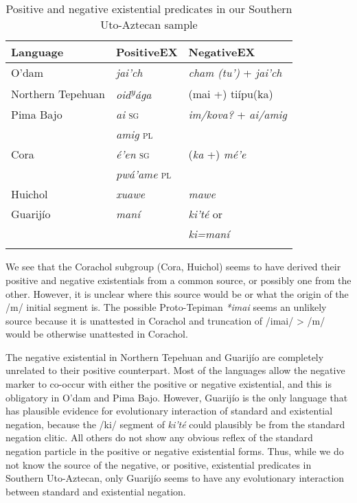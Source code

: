 \documentclass[output=paper,draft,draftmode,colorlinks,citecolor=brown]{langscibook}
\begin{document}
\begin{table}
\caption{Positive and negative existential predicates in our Southern Uto-Aztecan sample}
\label{tab:odam-suaposnegex}
    \centering
    \begin{tabularx}{.8\textwidth}{lXl}
    \lsptoprule
         Language & PositiveEX & NegativeEX \\
         \midrule
         O'dam & \emph{jai'ch} & \emph{cham (tu')} + \emph{jai'ch} \\
         \tablevspace
         Northern Tepehuan & \emph{oid\textsuperscript{y}ága} & (mai +) tiípu(ka)\\
         \tablevspace
         Pima Bajo & \emph{ai} \textsc{sg} & \emph{im/kova?} + \emph{ai/amig}\\
         & \emph{amig} \textsc{pl} & \\
         \tablevspace
         Cora & \emph{é'en} \textsc{sg} & (\emph{ka} +) \emph{mé'e}\\
         & \emph{pwá'ame} \textsc{pl} & \\
         \tablevspace
         Huichol & \emph{xuawe} & \emph{mawe}\\
         \tablevspace
         Guarijío & \emph{maní} & \emph{ki'té} or\\
         & & \emph{ki=maní}\\
         \lspbottomrule
    \end{tabularx}
\end{table}

We see that the Corachol subgroup (Cora, Huichol) seems to have derived their positive and negative existentials from a common source, or possibly one from the other. However, it is unclear where this source would be or what the origin of the /m/ initial segment is. The possible Proto-Tepiman \emph{*imai} seems an unlikely source because it is unattested in Corachol and truncation of /imai/ > /m/ would be otherwise unattested in Corachol. 

The negative existential in Northern Tepehuan and Guarijío are completely unrelated to their positive counterpart. Most of the languages allow the negative marker to co-occur with either the positive or negative existential, and this is obligatory in O'dam and Pima Bajo. However, Guarijío is the only language that has plausible evidence for evolutionary interaction of standard and existential negation, because the /ki/ segment of \emph{ki'té} could plausibly be from the standard negation clitic. All others do not show any obvious reflex of the standard negation particle in the positive or negative existential forms. Thus, while we do not know the source of the negative, or positive, existential predicates in Southern Uto-Aztecan, only Guarijío seems to have any evolutionary interaction between standard and existential negation.
\end{document}
